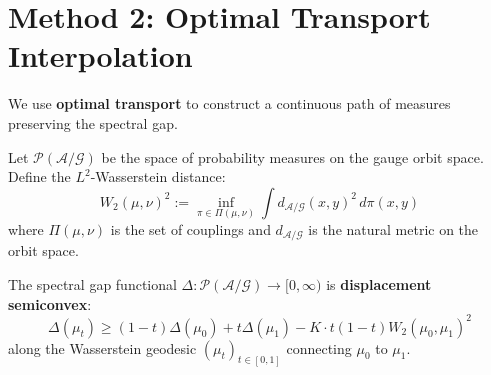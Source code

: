 \section{Method 2: Optimal Transport Interpolation}
\label{subsec:ot-interpolation}

We use \textbf{optimal transport} to construct a continuous path of measures 
preserving the spectral gap.

\begin{definition}
\label{def:wasserstein-gauge}
Let $\mathcal{P}(\mathcal{A}/\mathcal{G})$ be the space of probability measures on the 
gauge orbit space. Define the $L^2$-Wasserstein distance:
\begin{equation}
W_2(\mu, \nu)^2 := \inf_{\pi \in \Pi(\mu,\nu)} \int d_{\mathcal{A}/\mathcal{G}}(x, y)^2 \, d\pi(x, y)
\end{equation}
where $\Pi(\mu,\nu)$ is the set of couplings and $d_{\mathcal{A}/\mathcal{G}}$ is the 
natural metric on the orbit space.
\end{definition}

\begin{theorem}
\label{thm:displacement-convexity}
The spectral gap functional $\Delta: \mathcal{P}(\mathcal{A}/\mathcal{G}) \to [0, \infty)$ 
is \textbf{displacement semiconvex}:
\begin{equation}
\Delta(\mu_t) \geq (1-t)\Delta(\mu_0) + t\Delta(\mu_1) - K \cdot t(1-t) W_2(\mu_0, \mu_1)^2
\end{equation}
along the Wasserstein geodesic $(\mu_t)_{t \in [0,1]}$ connecting $\mu_0$ to $\mu_1$.
\end{theorem}

